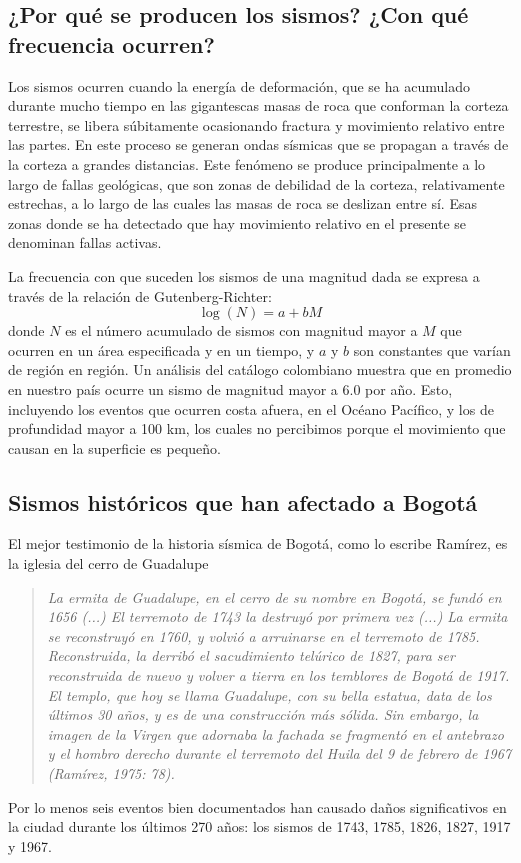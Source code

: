\documentclass[10pt,twoside]{article}
\begin{document}
\begin{multicols}{2}
\subsection*{¿Por qué se producen los sismos? ¿Con qué frecuencia ocurren?}
Los sismos ocurren cuando la energía de deformación, que se ha acumulado durante mucho tiempo en las gigantescas masas de roca que conforman la corteza terrestre, se libera súbitamente ocasionando fractura y movimiento relativo entre las partes. En este proceso se generan ondas sísmicas que se propagan a través de la corteza a grandes distancias. Este fenómeno se produce principalmente a lo largo de fallas geológicas, que son zonas de debilidad de la corteza, relativamente estrechas, a lo largo de las cuales las masas de roca se deslizan entre sí. Esas zonas donde se ha detectado que hay movimiento relativo en el presente se denominan fallas activas.

La frecuencia con que suceden los sismos de una magnitud dada se expresa a través de la relación de Gutenberg-Richter:
\[\log(N)=a+bM\]
donde $N$ es el número acumulado de sismos con magnitud mayor a $M$ que ocurren en un área especificada y en un tiempo, y $a$ y $b$ son constantes que varían de región en región. Un análisis del catálogo colombiano muestra que en promedio en nuestro país ocurre
un sismo de magnitud mayor a 6.0 por año. Esto, incluyendo los eventos que ocurren costa afuera, en el Océano Pacífico, y los de profundidad mayor a 100 km, los cuales no percibimos porque el
movimiento que causan en la superficie es pequeño.
\subsection*{Sismos históricos que han afectado a Bogotá}
El mejor testimonio de la historia sísmica de Bogotá, como lo escribe Ramírez, es la iglesia del cerro de Guadalupe
\begin{quote}
\textit{La ermita de Guadalupe, en el cerro de su nombre en Bogotá, se
fundó en 1656 (...) El terremoto de 1743 la destruyó por primera vez (...) La ermita se reconstruyó en 1760, y volvió a arruinarse en el terremoto de 1785. Reconstruida, la derribó el sacudimiento telúrico de 1827, para ser reconstruida de nuevo y volver a tierra
en los temblores de Bogotá de 1917. El templo, que hoy se llama Guadalupe, con su bella estatua, data de los últimos 30 años, y es de una construcción más sólida. Sin embargo, la imagen de
la Virgen que adornaba la fachada se fragmentó en el antebrazo y el hombro derecho durante el terremoto del Huila del 9 de febrero de 1967 (Ramírez, 1975: 78).}
\end{quote}
Por lo menos seis eventos bien documentados han causado daños
significativos en la ciudad durante los últimos 270 años: los sismos de 1743, 1785, 1826, 1827, 1917 y 1967.


\end{multicols}
\end{document}
